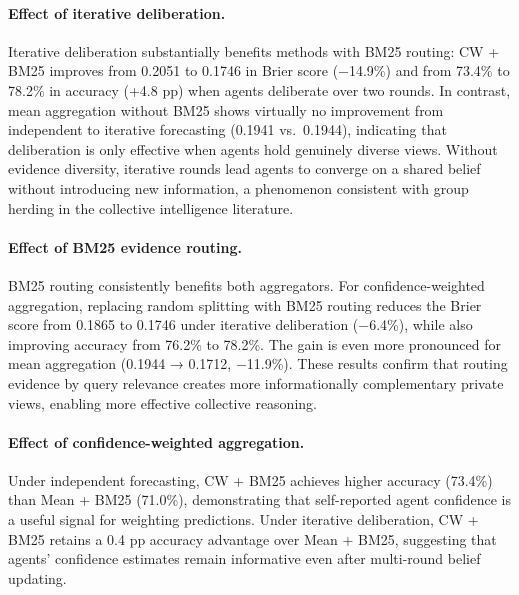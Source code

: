 \documentclass[11pt]{article}
\theoremstyle{definition}          %
\begin{document}
\paragraph{Effect of iterative deliberation.}
Iterative deliberation substantially benefits methods with BM25 routing:
CW + BM25 improves from 0.2051 to 0.1746 in Brier score (−14.9\%) and from 73.4\%
to 78.2\% in accuracy (+4.8 pp) when agents deliberate over two rounds.
In contrast, mean aggregation without BM25 shows virtually no improvement from
independent to iterative forecasting (0.1941 vs.\ 0.1944), indicating that deliberation
is only effective when agents hold genuinely diverse views.
Without evidence diversity, iterative rounds lead agents to converge on a shared belief
without introducing new information, a phenomenon consistent with group herding in
the collective intelligence literature.

\paragraph{Effect of BM25 evidence routing.}
BM25 routing consistently benefits both aggregators.
For confidence-weighted aggregation, replacing random splitting with BM25 routing
reduces the Brier score from 0.1865 to 0.1746 under iterative deliberation (−6.4\%),
while also improving accuracy from 76.2\% to 78.2\%.
The gain is even more pronounced for mean aggregation (0.1944 → 0.1712, −11.9\%).
These results confirm that routing evidence by query relevance creates more
informationally complementary private views, enabling more effective collective reasoning.

\paragraph{Effect of confidence-weighted aggregation.}
Under independent forecasting, CW + BM25 achieves higher accuracy (73.4\%) than
Mean + BM25 (71.0\%), demonstrating that self-reported agent confidence is a useful
signal for weighting predictions.
Under iterative deliberation, CW + BM25 retains a 0.4 pp accuracy advantage over
Mean + BM25, suggesting that agents' confidence estimates remain informative even after
multi-round belief updating.
\end{document}
